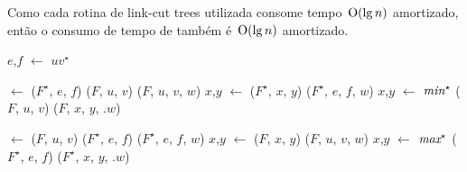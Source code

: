 Como cada rotina de link-cut trees utilizada consome tempo~$\mathrm{O}(\lg n)$ amortizado, então o consumo de tempo de \MSFupdate{} também é~$\mathrm{O}(\lg n)$ amortizado.


\begin{algorithm}[htb]
\caption{\MSFupdate($G$, $u$, $v$, $w$)}
\label{Algo:MSFupdate}
\begin{algorithmic}[1]
\State $e$,$f$ $\gets$ $uv^\star$
\label{Algo:MSFupdate:linhauvinF}

\State {} $\gets$ \linkcutMin($F^\star$, $e$, $f$)
\State \linkcutDelEdge($F$, $u$, $v$)
\State \linkcutAddEdge($F$, $u$, $v$, $w$)
\Else
\State $x$,$y$ $\gets$ 
\State \linkcutDelEdge($F^\star$, $x$, $y$)
\State \linkcutAddEdge($F^\star$, $e$, $f$, $w$)
\State $x$,$y$ $\gets$ $\textit{min}^\star$
\State \linkcutDelEdge($F$, $u$, $v$)
\State \linkcutAddEdge($F$, $x$, $y$, .$w$)
\EndIf

\Else

\State {} $\gets$ \linkcutMax($F$, $u$, $v$)\label{Algo:MSFupdate:dualinicio}
\State \linkcutDelEdge($F^\star$, $e$, $f$)
\State \linkcutAddEdge($F^\star$, $e$, $f$, $w$)
\Else
\State $x$,$y$ $\gets$ 
\State \linkcutDelEdge($F$, $x$, $y$)
\State \linkcutAddEdge($F$, $u$, $v$, $w$)
\State $x$,$y$ $\gets$ $\textit{max}^\star$
\State \linkcutDelEdge($F^\star$, $e$, $f$)
\State \linkcutAddEdge($F^\star$, $x$, $y$, .$w$)\label{Algo:MSFupdate:dualfim}
\EndIf

\EndIf
\end{algorithmic}
\end{algorithm}

